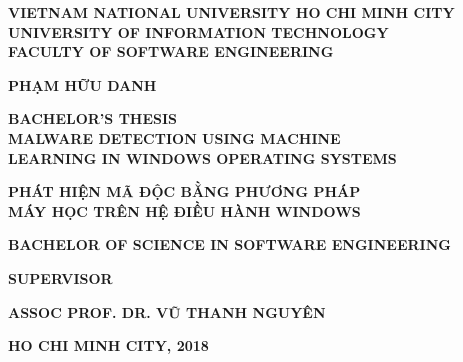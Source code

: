 \begin{titlepage}

\thisfancypage{
    \setlength{\fboxsep}{15pt}
    \doublebox
}{}

\begin{center}
  
\textbf{\large VIETNAM NATIONAL UNIVERSITY HO CHI MINH CITY} \\[2mm]
\textbf{\Large UNIVERSITY OF INFORMATION TECHNOLOGY} \\ [2mm]
\textbf{\Large FACULTY OF SOFTWARE ENGINEERING}

\vspace{0.07\textheight}
\begin{otherlanguage}{vietnamese}
\textbf{\large PHẠM HỮU DANH}
\end{otherlanguage}

\vspace{0.1\textheight}
\textbf{\Large BACHELOR’S THESIS} \\ [10mm]

\textbf{\Large MALWARE DETECTION USING MACHINE } \\ [2mm]
\textbf{\Large LEARNING IN WINDOWS OPERATING SYSTEMS} \\ [10mm]
\begin{otherlanguage}{vietnamese}
\textbf{ \Large PHÁT HIỆN MÃ ĐỘC BẰNG PHƯƠNG PHÁP} \\ [2mm]
\textbf{ \Large MÁY HỌC TRÊN HỆ ĐIỀU HÀNH WINDOWS}
\end{otherlanguage}

\vspace{0.1\textheight}
\textbf{\large BACHELOR OF SCIENCE IN SOFTWARE ENGINEERING} 

\vspace{0.07\textheight}
\textbf{\large SUPERVISOR} \\ [2mm]
\begin{otherlanguage}{vietnamese}
\textbf{\large ASSOC PROF. DR. VŨ THANH NGUYÊN}
\end{otherlanguage}


\vspace{\fill}
\textbf{\large HO CHI MINH CITY, 2018}

\end{center}
\end{titlepage}
\cleardoublepage
